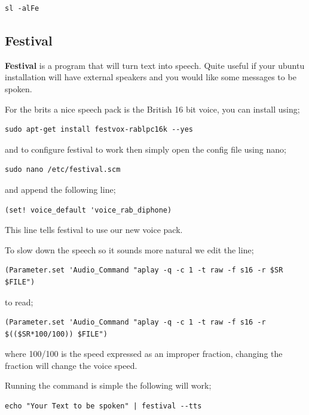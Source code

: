\begin{lstlisting}
sl -alFe
\end{lstlisting}

\subsection{Festival}
\textbf{Festival} is a program that will turn text into speech.  Quite useful if your ubuntu installation will have external speakers and you would like some messages to be spoken.

For the brits a nice speech pack is the British 16 bit voice, you can install using;

\begin{lstlisting}
sudo apt-get install festvox-rablpc16k --yes
\end{lstlisting}

and to configure festival to work then simply open the config file using nano;

\begin{lstlisting}
sudo nano /etc/festival.scm
\end{lstlisting}

and append the following line;

\begin{verbatim}
(set! voice_default 'voice_rab_diphone)
\end{verbatim}

This line tells festival to use our new voice pack.

To slow down the speech so it sounds more natural we edit the line;

\begin{verbatim}
(Parameter.set 'Audio_Command "aplay -q -c 1 -t raw -f s16 -r $SR $FILE")
\end{verbatim}

to read;

\begin{verbatim}
(Parameter.set 'Audio_Command "aplay -q -c 1 -t raw -f s16 -r $(($SR*100/100)) $FILE")
\end{verbatim}

where 100/100 is the speed expressed as an improper fraction, changing the fraction will change the voice speed.

Running the command is simple the following will work;

\begin{lstlisting}
echo "Your Text to be spoken" | festival --tts
\end{lstlisting}

